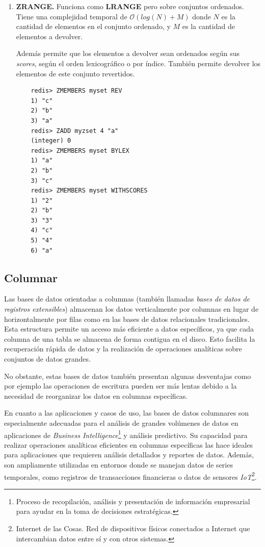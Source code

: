 \documentclass[pdflatex,sn-mathphys-num]{sn-jnl}
\theoremstyle{thmstyleone}%
\theoremstyle{thmstyletwo}%
\theoremstyle{thmstylethree}%
\begin{document}
\begin{enumerate}
    \vspace{-0.5cm}
    
    \item \textbf{ZRANGE.} Funciona como \textbf{LRANGE} pero sobre conjuntos ordenados. Tiene una complejidad temporal de $\mathcal{O}(log(N) + M)$ donde $N$ es la cantidad de elementos en el conjunto ordenado, y $M$ es la cantidad de elementos a devolver.

    Además permite que los elementos a devolver sean ordenados según sus \textit{scores}, según el orden lexicográfico o por índice. También permite devolver los elementos de este conjunto revertidos.

    \begin{verbatim}
    redis> ZMEMBERS myset REV
    1) "c"
    2) "b"
    3) "a"
    redis> ZADD myzset 4 "a"
    (integer) 0
    redis> ZMEMBERS myset BYLEX
    1) "a"
    2) "b"
    3) "c"
    redis> ZMEMBERS myset WITHSCORES
    1) "2"
    2) "b"
    3) "3"
    4) "c"
    5) "4"
    6) "a"
    \end{verbatim}
\end{enumerate}

\vspace{-1cm}

\subsection{Columnar}\label{sec42}

Las bases de datos orientadas a columnas (también llamadas \textit{bases de datos de registros extensibles}) almacenan los datos verticalmente por columnas en lugar de horizontalmente por filas como en las bases de datos relacionales tradicionales. Esta estructura permite un acceso más eficiente a datos específicos, ya que cada columna de una tabla se almacena de forma contigua en el disco. Esto facilita la recuperación rápida de datos y la realización de operaciones analíticas sobre conjuntos de datos grandes.

No obstante, estas bases de datos también presentan algunas desventajas como por ejemplo las operaciones de escritura pueden ser más lentas debido a la necesidad de reorganizar los datos en columnas específicas.

En cuanto a las aplicaciones y casos de uso, las bases de datos columnares son especialmente adecuadas para el análisis de grandes volúmenes de datos en aplicaciones de \textit{Business Intelligence}\footnote{Proceso de recopilación, análisis y presentación de información empresarial para ayudar en la toma de decisiones estratégicas.} y análisis predictivo. Su capacidad para realizar operaciones analíticas eficientes en columnas específicas las hace ideales para aplicaciones que requieren análisis detallados y reportes de datos. Además, son ampliamente utilizadas en entornos donde se manejan datos de series temporales, como registros de transacciones financieras o datos de sensores \textit{IoT}\footnote{Internet de las Cosas. Red de dispositivos físicos conectados a Internet que intercambian datos entre sí y con otros sistemas.}.
\end{document}
